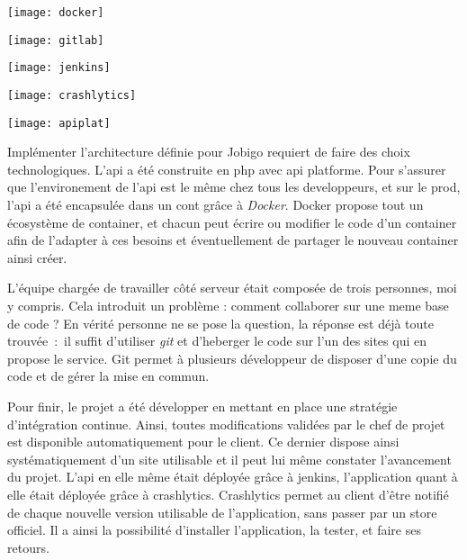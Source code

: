 \documentclass[rapport.tex]{subfiles}
\begin{document}
        \begin{center}
        \begin{minipage}{2.5cm}
            \texttt{[image: docker]}
        \end{minipage}
        \begin{minipage}{2.5cm}
            \texttt{[image: gitlab]}
        \end{minipage}
        \begin{minipage}{3cm}
            \texttt{[image: jenkins]}
        \end{minipage}
        \begin{minipage}{2.5cm}
            \texttt{[image: crashlytics]}
        \end{minipage}
        \begin{minipage}{2.5cm}
            \texttt{[image: apiplat]}
        \end{minipage}
    \end{center}

        Implémenter l'architecture définie pour Jobigo requiert de faire des choix technologiques.
        L'\gls{api} a été construite en php avec api platforme\cite{apip}.
        Pour s'assurer que l'environement de l'\gls{api} est le même chez tous les developpeurs, et sur le
        \gls{prod}, l'\gls{api} a été encapsulée dans un \gls{cont} grâce à \textit{Docker}. Docker propose
        tout un écosystème de container, et chacun peut écrire ou modifier le code d'un container afin
        de l'adapter à ces besoins et éventuellement de partager le nouveau container ainsi créer.

        L'équipe chargée de travailler côté serveur était composée de trois personnes, moi y compris.
        Cela introduit un problème : comment collaborer sur une meme base de code ? En vérité personne ne se pose
        la question, la réponse est déjà toute trouvée~:~il suffit d'utiliser \emph{git} et d'heberger le code
        sur l'un des sites qui en propose le service. Git permet à plusieurs développeur de disposer d'une copie du code
        et de gérer la mise en commun. 

        Pour finir, le projet a été développer en mettant en place une stratégie d'intégration continue.
        Ainsi, toutes modifications validées par le chef de projet est disponible automatiquement pour le client.
        Ce dernier dispose ainsi systématiquement d'un site utilisable et il peut lui même constater l'avancement du projet.
        L'\gls{api} en elle même était déployée grâce à jenkins, l'application quant à elle était déployée grâce à crashlytics.
        Crashlytics permet au client d'être notifié de chaque nouvelle version utilisable de l'application, sans passer par un store officiel.
        Il a ainsi la possibilité d'installer l'application, la tester, et faire ses retours.
\end{document}
